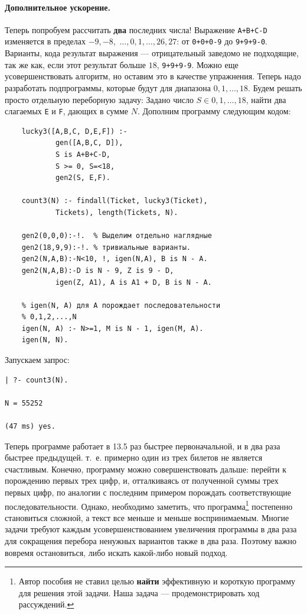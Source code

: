 \documentclass[12pt, openany, twoside]{book} %
\begin{document}
\paragraph{Дополнительное ускорение.} Теперь попробуем рассчитать \textbf{два} последних числа! Выражение \texttt{A+B+C-D} изменяется в пределах $-9,-8,$ $\ldots,0,1,\ldots,26,27$: от \texttt{0+0+0-9} до \texttt{9+9+9-0}. Варианты, кода результат выражения --- отрицательный заведомо не подходящие, так же как, если этот результат больше $18$, \texttt{9+9+9-9}. Можно еще усовершенствовать алгоритм, но оставим это в качестве упражнения. Теперь надо разработать подпрограммы, которые будут для диапазона $0,1,\ldots,18$. Будем решать просто отдельную переборную задачу: Задано число $S \in 0,1,\ldots,18$, найти два слагаемых \texttt{E} и \texttt{F}, дающих в сумме $N$. Дополним программу следующим кодом:
{\tt\begin{verbatim}
    lucky3([A,B,C, D,E,F]) :-
            gen([A,B,C, D]),
            S is A+B+C-D,
            S >= 0, S=<18,
            gen2(S, E,F).

    count3(N) :- findall(Ticket, lucky3(Ticket),
            Tickets), length(Tickets, N).

    gen2(0,0,0):-!.  % Выделим отдельно наглядные
    gen2(18,9,9):-!. % тривиальные варианты.
    gen2(N,A,B):-N<10, !, igen(N,A), B is N - A.
    gen2(N,A,B):-D is N - 9, Z is 9 - D,
            igen(Z, A1), A is A1 + D, B is N - A.

    % igen(N, A) для A порождает последовательности
    % 0,1,2,...,N
    igen(N, A) :- N>=1, M is N - 1, igen(M, A).
    igen(N, N).
\end{verbatim}}
\noindent{} Запускаем запрос:
{\tt\begin{verbatim}
| ?- count3(N).

N = 55252

(47 ms) yes.
\end{verbatim}}
\noindent{}Теперь программе работает в 13.5 раз быстрее первоначальной, и в два раза быстрее предыдущей. т.~е. примерно один из трех билетов не является счастливым. Конечно, программу можно совершенствовать дальше: перейти к порождению первых трех цифр, и, отталкиваясь от полученной суммы трех первых цифр, по аналогии с последним примером порождать соответствующие последовательности. Однако, необходимо заметить, что программа\footnote{Автор пособия не ставил целью \textbf{найти} эффективную и короткую программу для решения этой задачи. Наша задача --- продемонстрировать ход рассуждений.} постепенно становиться сложной, а текст все меньше и меньше воспринимаемым. Многие задачи требуют каждым усовершенствованием увеличения программы в два раза для сокращения перебора ненужных вариантов также в два раза. Поэтому важно вовремя остановиться, либо искать какой-либо новый подход.
\end{document}
